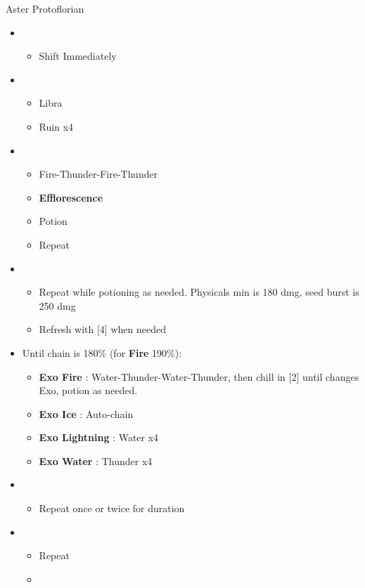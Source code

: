 \begin{battle}{Aster Protoflorian}
\begin{multicols}{2}
\begin{itemize}
    \item \first
    \begin{itemize}
        \item Shift Immediately
    \end{itemize}
    \item \third
    \begin{itemize}
        \item Libra
        \item Ruin x4
    \end{itemize}
    \item \fourth
    \begin{itemize}
        \item Fire-Thunder-Fire-Thunder
        \item \textbf{Efflorescence}
        \item Potion
        \item Repeat
    \end{itemize}
    \item \fifth
    \begin{itemize}
        \item Repeat while potioning as needed. Physicals min is 180 dmg, seed burst is 250 dmg
        \item Refresh with [4] when needed
    \end{itemize}
    \item Until chain is 180\% (for \textbf{Fire} 190\%):
    \begin{itemize}
        \item \textbf{Exo Fire} : Water-Thunder-Water-Thunder, then chill in [2] until changes Exo, potion as needed.
        \item \textbf{Exo Ice} : Auto-chain
        \item \textbf{Exo Lightning} : Water x4
        \item \textbf{Exo Water} : Thunder x4
    \end{itemize}
    \columnbreak
    \item \first
    \begin{itemize}
        \item Repeat once or twice for duration
    \end{itemize}
    \item \fourth
    \begin{itemize}
        \item Repeat
        \item \stagger
     \end{itemize}
     

\end{itemize}
\end{multicols}
\end{battle}
